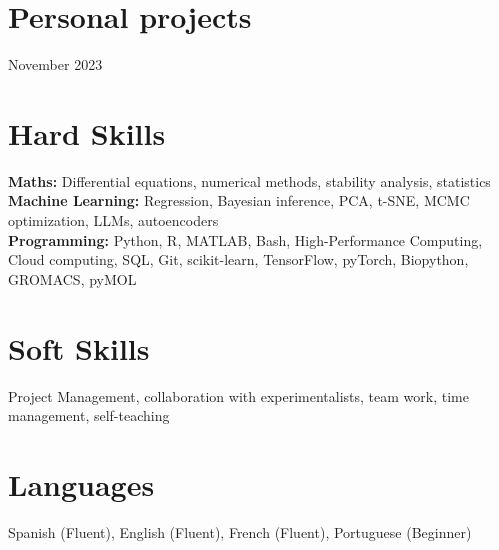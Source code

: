 \documentclass{ExpressiveResume}
\begin{document}
\section{Personal projects}

 {November 2023}{}{
    }


\section{Hard Skills}
\noindent \textbf{Maths:} Differential equations, numerical methods, stability analysis, statistics\\
\textbf{Machine Learning:} Regression, Bayesian inference, PCA, t-SNE, MCMC optimization, LLMs, autoencoders\\
\textbf{Programming:} Python, R, MATLAB, Bash, High-Performance Computing, Cloud computing, SQL, Git, scikit-learn, TensorFlow, pyTorch, Biopython, GROMACS, pyMOL

\section{Soft Skills}
    \noindent Project Management, collaboration with experimentalists, team work, time management, self-teaching

\section{Languages}
\noindent Spanish (Fluent), English (Fluent), French (Fluent), Portuguese (Beginner)
\end{document}

